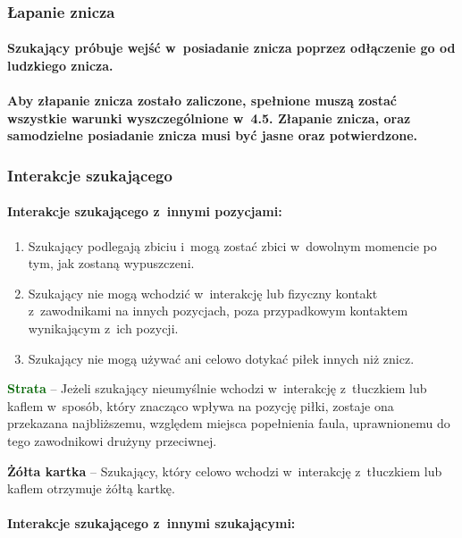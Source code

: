 \documentclass[12pt]{article}
\newcommand\yellowcard[1]{\bgroup\textcolor{darkyellow}{\textbf{#1}}}
\newcommand\other[1]{\bgroup\textcolor{darkgreen}{\textbf{#1}}}
\begin{document}
\subsubsection{Łapanie znicza}

\paragraph{Szukający próbuje wejść w~posiadanie znicza poprzez
	odłączenie go od ludzkiego znicza.}

\paragraph{Aby złapanie znicza zostało zaliczone, spełnione muszą
	zostać wszystkie warunki wyszczególnione w~4.5. Złapanie znicza, oraz
	samodzielne posiadanie znicza musi być jasne oraz potwierdzone.}

\subsubsection{Interakcje szukającego}

\paragraph{Interakcje szukającego z~innymi pozycjami: }

\begin{enumerate}
	\item
	      Szukający podlegają zbiciu i~mogą zostać zbici w~dowolnym momencie po
	      tym, jak zostaną wypuszczeni.
	\item
	      Szukający nie mogą wchodzić w~interakcję lub fizyczny kontakt z~zawodnikami na innych pozycjach, poza przypadkowym kontaktem
	      wynikającym z~ich pozycji.
	\item
	      Szukający nie mogą używać ani celowo dotykać piłek innych niż znicz.
\end{enumerate}

\other{Strata} -- Jeżeli szukający nieumyślnie wchodzi w~interakcję z~tłuczkiem lub kaflem w~sposób, który znacząco wpływa na pozycję piłki,
zostaje ona przekazana najbliższemu, względem miejsca popełnienia faula,
uprawnionemu do tego zawodnikowi drużyny przeciwnej.

\yellowcard{Żółta kartka} -- Szukający, który celowo wchodzi w~interakcję z~tłuczkiem lub kaflem otrzymuje żółtą kartkę.

\paragraph{Interakcje szukającego z~innymi szukającymi:}
\end{document}
